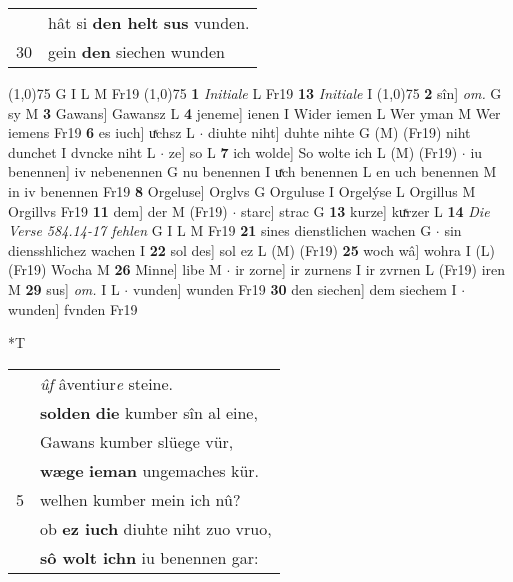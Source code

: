 \documentclass[8pt,a4paper,notitlepage]{article}
\begin{document}
\begin{table}[ht]
\begin{minipage}[t]{0.5\linewidth}
\begin{tabular}{rl}
 & hât si \textbf{den helt} \textbf{sus} vunden.\\ 
30 & gein \textbf{den} siechen wunden\\ 
\end{tabular}
\scriptsize
\line(1,0){75} \newline
G I L M Fr19 \newline
\line(1,0){75} \newline
\textbf{1} \textit{Initiale} L Fr19  \textbf{13} \textit{Initiale} I  \newline
\line(1,0){75} \newline
\textbf{2} sîn] \textit{om.} G sy M \textbf{3} Gawans] Gawansz L \textbf{4} jeneme] ienen I Wider iemen L Wer yman M Wer iemens Fr19 \textbf{6} es iuch] uͯchsz L  $\cdot$ diuhte niht] duhte nihte G (M) (Fr19) niht dunchet I dvncke niht L  $\cdot$ ze] so L \textbf{7} ich wolde] So wolte ich L (M) (Fr19)  $\cdot$ iu benennen] iv nebenennen G nu benennen I uͯch benennen L en uch benennen M in iv benennen Fr19 \textbf{8} Orgeluse] Orglvs G Orguluse I Orgelýse L Orgillus M Orgillvs Fr19 \textbf{11} dem] der M (Fr19)  $\cdot$ starc] strac G \textbf{13} kurze] kuͯrzer L \textbf{14} \textit{Die Verse 584.14-17 fehlen} G I L M Fr19  \textbf{21} sines dienstlichen wachen G  $\cdot$ sin diensshlichez wachen I \textbf{22} sol des] sol ez L (M) (Fr19) \textbf{25} woch wâ] wohra I (L) (Fr19) Wocha M \textbf{26} Minne] libe M  $\cdot$ ir zorne] ir zurnens I ir zvrnen L (Fr19) iren M \textbf{29} sus] \textit{om.} I L  $\cdot$ vunden] wunden Fr19 \textbf{30} den siechen] dem siechem I  $\cdot$ wunden] fvnden Fr19 \newline
\end{minipage}
\hspace{0.5cm}
\begin{minipage}[t]{0.5\linewidth}
\small
\begin{center}*T
\end{center}
\begin{tabular}{rl}
 & \textit{ûf} âventiur\textit{e} steine.\\ 
 & \textbf{solden} \textbf{die} kumber sîn al eine,\\ 
 & Gawans kumber slüege vür,\\ 
 & \textbf{wæge} \textbf{ieman} ungemaches kür.\\ 
5 & welhen kumber mein ich nû?\\ 
 & ob \textbf{ez iuch} diuhte niht zuo vruo,\\ 
 & \textbf{sô wolt ich}\textbf{n} iu benennen gar:\\ 

\end{tabular}
\end{minipage}
\end{table}
\end{document}

